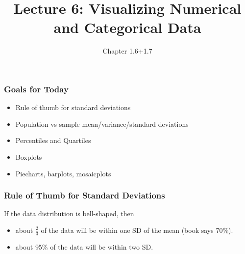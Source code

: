 \documentclass[handout]{beamer}
\title{Lecture 6: Visualizing Numerical and Categorical Data}
\author{Chapter 1.6+1.7}
\date{}
\newcommand{\blue}[1]{\textcolor{blue2}{#1}}
\begin{document}
\begin{frame}
\titlepage
\end{frame}


\begin{frame}[fragile]
\frametitle{Goals for Today}

\begin{itemize}
\item Rule of thumb for standard deviations
\item Population vs sample mean/variance/standard deviations
\item Percentiles and Quartiles
\item Boxplots
\item Piecharts, barplots, mosaicplots
\end{itemize}

\end{frame}


\begin{frame}[fragile]
\frametitle{Rule of Thumb for Standard Deviations}

%
%
If the data distribution is bell-shaped, then 
\begin{itemize}
\item about \blue{$\frac{2}{3}$} of the data will be within one SD of the mean (book says 70\%).
\item about \blue{95\%} of the data will be within two SD.
\end{itemize}

\end{frame}
\end{document}
